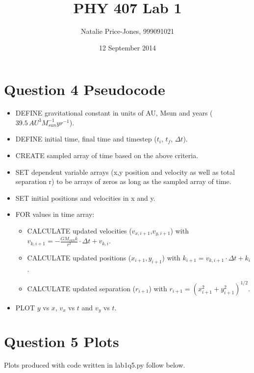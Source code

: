 \documentclass[a4paper,12pt]{article}
\begin{document}
\onehalfspacing
\title{PHY 407 Lab 1}
\author{Natalie Price-Jones, 999091021}
\date{12 September 2014}
\maketitle

\section{Question 4 Pseudocode}
\begin{itemize}
\item DEFINE gravitational constant in units of AU, Msun and years ($39.5\, AU^3M_{sun}^{-1}yr^{-1}$).
\item DEFINE initial time, final time and timestep ($t_i$, $t_f$, $\Delta t$).
\item CREATE sampled array of time based on the above criteria.
\item SET dependent variable arrays (x,y position and velocity as well as total separation r) to be arrays of zeros as long as the sampled array of time.
\item SET initial positions and velocities in x and y.
\item FOR values in time array:
\begin{itemize}
	\item CALCULATE updated velocities ($v_{x,i+1}$,$v_{y,i+1}$) with $v_{k,i+1} = -\frac{GM_{sun}k}{r^3}\cdot \Delta t + v_{k,i}$. 
	\item CALCULATE updated positions ($x_{i+1}, y_{i+1}$) with $k_{i+1} = v_{k,i+1}\cdot \Delta t + k_i$.
	\item CALCULATE updated separation ($r_{i+1}$) with $r_{i+1} = (x_{i+1}^2 + y_{i+1}^2)^{1/2}$.
\end{itemize}
\item PLOT $y$ vs $x$, $v_x$ vs $t$ and $v_y$ vs $t$.
\end{itemize}

\section{Question 5 Plots}

Plots produced with code written in lab1q5.py follow below.
\end{document}

